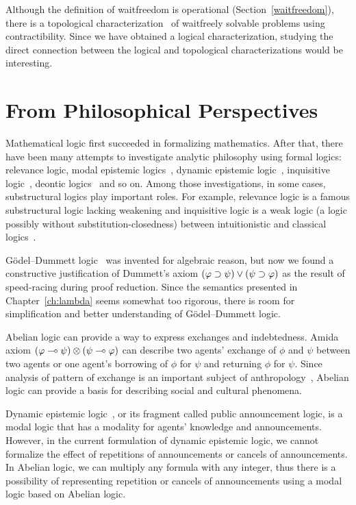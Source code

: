 Although the definition of waitfreedom is operational
(Section~\ref{waitfreedom}),
there is a topological characterization~\citep{Herlihy99,Saks:1993vq} of
waitfreely solvable problems using contractibility.
Since we have obtained a logical characterization, studying the direct
connection between the logical and topological characterizations would
be interesting.

\section{From Philosophical Perspectives}

Mathematical logic first succeeded in formalizing mathematics.
After that, there have been many attempts to investigate analytic
philosophy
using formal logics: relevance logic, modal epistemic
logics~\citep{sep-logic-epistemic},
dynamic epistemic logic~\citep{ditmarsch2007dynamic},
inquisitive logic~\citep{ciardelli2011},
deontic logics~\citep{von1951deontic} and
so on.  Among those investigations, in some cases, substructural logics
play important roles.  For example, relevance logic is a famous
substructural logic lacking weakening and inquisitive logic is a weak
logic (a logic possibly without substitution-closedness) between
intuitionistic and classical logics~\citep{ciardelli2011}.

G\"odel--Dummett logic~\citep{dummett59} was invented for algebraic
reason, but now we found a constructive justification of Dummett's axiom
$(\varphi\supset\psi)\lor(\psi\supset\varphi)$ as the result of speed-racing during
proof reduction.  Since the semantics presented in
Chapter~\ref{ch:lambda} seems somewhat too rigorous,
there is room for simplification and better understanding of
G\"odel--Dummett logic.

Abelian logic can provide a way to express
exchanges and indebtedness.
Amida axiom $(\varphi\multimap
\psi)\otimes(\psi\multimap\varphi)$
can describe two agents' exchange of $\phi$ and $\psi$ between two agents
or one agent's borrowing of $\phi$ for $\psi$ and returning $\phi$ for
$\psi$.
Since analysis of pattern of exchange is an important subject of
anthropology~\citep{kula1920}, Abelian logic can provide a
basis for describing social and cultural phenomena.

Dynamic epistemic logic~\citep{ditmarsch2007dynamic}, or its fragment
called public announcement
logic, is a modal logic that has a modality for agents' knowledge and
announcements.  However, in the current formulation of dynamic epistemic
logic, we cannot formalize the effect of repetitions of announcements or
cancels of announcements.  In Abelian logic, we can multiply any formula
with any integer, thus there is a possibility of representing repetition
or cancels of announcements using a modal logic based on Abelian logic.

